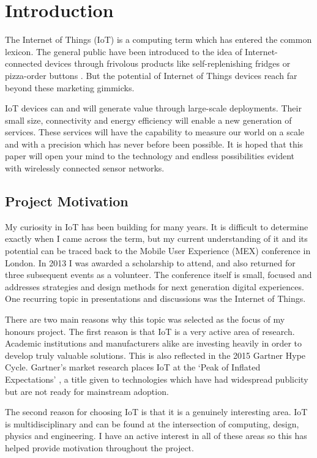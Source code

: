 \chapter{Introduction}
  The Internet of Things (IoT) is a computing term which has entered the common lexicon. The general public have been introduced to the idea of Internet-connected devices through frivolous products like self-replenishing fridges or pizza-order buttons \citep{dominos-order}. But the potential of Internet of Things devices reach far beyond these marketing gimmicks.

  IoT devices can and will generate value through large-scale deployments. Their small size, connectivity and energy efficiency will enable a new generation of services. These services will have the capability to measure our world on a scale and with a precision which has never before been possible. It is hoped that this paper will open your mind to the technology and endless possibilities evident with wirelessly connected sensor networks.

  \section{Project Motivation}
    My curiosity in IoT has been building for many years. It is difficult to determine exactly when I came across the term, but my current understanding of it and its potential can be traced back to the Mobile User Experience (MEX) conference in London. In 2013 I was awarded a scholarship to attend, and also returned for three subsequent events as a volunteer. The conference itself is small, focused and addresses strategies and design methods for next generation digital experiences. One recurring topic in presentations and discussions was the Internet of Things.

    There are two main reasons why this topic was selected as the focus of my honours project. The first reason is that IoT is a very active area of research. Academic institutions and manufacturers alike are investing heavily in order to develop truly valuable solutions. This is also reflected in the 2015 Gartner Hype Cycle. Gartner's market research places IoT at the `Peak of Inflated Expectations' \citep{gartner-hype-cycle}, a title given to technologies which have had widespread publicity but are not ready for mainstream adoption.

    The second reason for choosing IoT is that it is a genuinely interesting area. IoT is multidisciplinary and can be found at the intersection of computing, design, physics and engineering. I have an active interest in all of these areas so this has helped provide motivation throughout the project.

